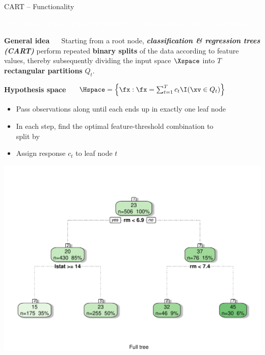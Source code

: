 \documentclass[11pt,compress,t,notes=noshow, xcolor=table]{beamer}
\newcommand{\maketag}[1]{\colorbox{highlightcol}{\textcolor{white}
{\MakeUppercase{#1}}}}
\newcommand{\highlight}[1]{\textcolor{highlightcol}{\textbf{#1}}}
\newcommand{\bfit}[1]{\textbf{\textit{#1}}}
\begin{document}
\begin{frame}{CART -- Functionality}

\footnotesize

\maketag{Supervised}
\maketag{Non-parametric}
\maketag{White-box}
\maketag{Feature selection}

\medskip

\highlight{General idea} ~~ Starting from a root node, 
\bfit{classification \& regression trees (CART)} 
perform repeated \textbf{binary splits} of the data according to feature values, 
thereby subsequently dividing the input space $\Xspace$ into $T$ 
\textbf{rectangular partitions} $Q_t$.

\medskip
 
\highlight{Hypothesis space} ~~
$\Hspace = \left\{ \fx: \fx = \sum_{t = 1}^T c_t \I(\xv \in Q_t) 
\right\}$

\medskip

\begin{minipage}{0.6\textwidth}
  \begin{itemize}
    \item Pass observations along until each ends up in exactly 
    one leaf node
    \item In each step, find the optimal feature-threshold
    combination to \\ split by
  \item Assign response $c_t$ to leaf node $t$
\end{itemize}

\end{minipage}%
\begin{minipage}{0.4\textwidth}
  \includegraphics[width=\textwidth]{figure/cart.pdf}
\end{minipage}

\end{frame}
\end{document}
